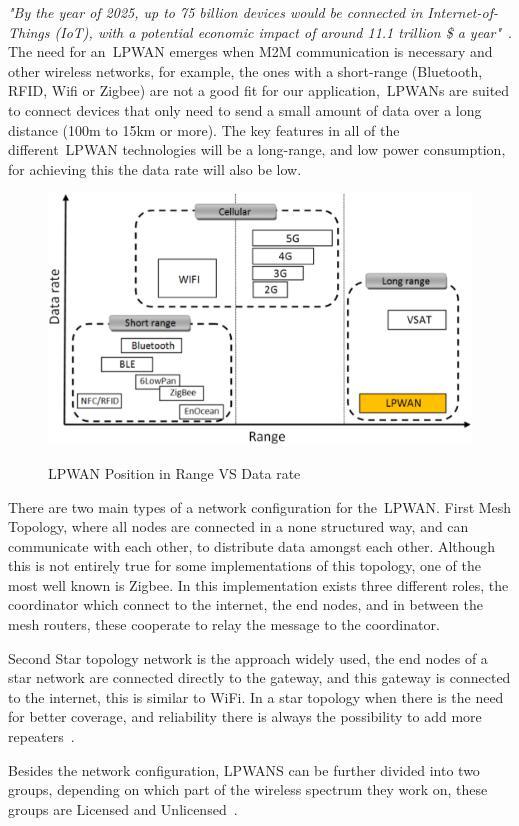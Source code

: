 \textit{"By the year of 2025, up to 75 billion devices would be connected in Internet-of-Things (\gls{IoT}), with a potential economic impact of around 11.1 trillion \$ a year"}~\cite{ LPIkpehai2019}. The need for an~\gls{LPWAN} emerges when M2M communication is necessary and other wireless networks, for example, the ones with a short-range (Bluetooth, RFID, Wifi or Zigbee) are not a good fit for our application,~\gls{LPWAN}s are suited to connect devices that only need to send a small amount of data over a long distance (100m to 15km or more). The key features in all of the  different~\gls{LPWAN} technologies will be a long-range, and low power consumption, for achieving this the data rate will also be low.

\begin{figure}[htbp]
  \centering
  
    {\includegraphics[width=0.5\linewidth]{Chapters/Figures/LPWAN-Positioning.JPG}}%
 
  \caption{LPWAN Position in Range VS Data rate~\cite{Mekki2019}}
  \label{fig:LPWAN_Positioning}
\end{figure}

There are two main types of a network configuration for the~\gls{LPWAN}.
First Mesh Topology, where all nodes are connected in a none structured way, and can communicate with each other, to distribute data amongst each other. Although this is not entirely true for some implementations of this topology, one of the most well known is Zigbee. In this implementation exists three different roles, the coordinator which connect to the internet, the end nodes, and in between the mesh routers, these cooperate to relay the message to the coordinator. 

Second Star topology network is the approach widely used, the end nodes of a star network are connected directly to the gateway, and this gateway is connected to the internet, this is similar to WiFi. In a star topology when there is the  need for  better coverage,  and reliability there is always the possibility to add more repeaters~\cite{LPLinkLabs}.

Besides the network configuration, LPWANS can be further divided into two groups, depending on which part of the wireless spectrum they work on, these groups are Licensed and Unlicensed~\cite{LPZourmand2019}.


